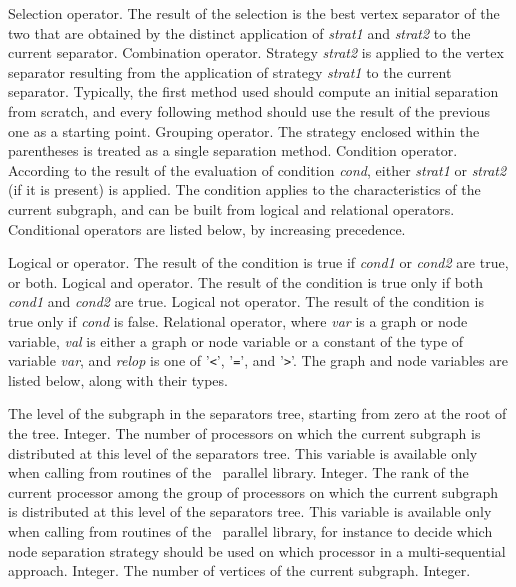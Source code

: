 \begin{itemize}
Selection operator. The result of the selection is the best vertex separator of
the two that are obtained by the distinct application of {\it strat1\/} and
{\it strat2\/} to the current separator.
Combination operator. Strategy {\it strat2\/} is applied to the vertex
separator resulting from the application of strategy {\it strat1\/} to the
current separator. Typically, the first method used should compute an initial
separation from scratch, and every following method should use the
result of the previous one as a starting point.
\iteme[{\tt (}{\it strat\/}{\tt )}]
Grouping operator.
The strategy enclosed within the parentheses is treated as a single
separation method.
Condition operator. According to the result of the evaluation of condition
{\it cond}, either {\it strat1\/} or {\it strat2\/} (if it is present) is
applied. The condition applies to the characteristics of the current subgraph,
and can be built from logical and relational operators. Conditional
operators are listed below, by increasing precedence.
\begin{itemize}
Logical or operator. The result of the condition is true if {\it cond1\/}
or {\it cond2\/} are true, or both.
Logical and operator. The result of the condition is true only if both
{\it cond1\/} and {\it cond2\/} are true.
\iteme[{\tt !}{\it cond}]
Logical not operator. The result of the condition is true only if
{\it cond\/} is false.
Relational operator, where {\it var\/} is a graph or node variable,
{\it val\/} is either a graph or node variable or a constant of the type of
variable {\it var\/}, and {\it relop\/} is one of
'{\tt\verb+<+}', '{\tt\verb+=+}', and '{\tt\verb+>+}'.
The graph and node variables are listed below, along with their types.
\begin{itemize}
\iteme[{\tt levl}]
The level of the subgraph in the separators tree, starting from zero at the root
of the tree.
Integer.
\iteme[{\tt proc}]
The number of processors on which the current subgraph is distributed
at this level of the separators tree. This variable is available only
when calling from routines of the \ptscotch\ parallel library.
Integer.
\iteme[{\tt rank}]
The rank of the current processor among the group of processors on
which the current subgraph is distributed at this level of the
separators tree. This variable is available only
when calling from routines of the \ptscotch\ parallel library, for
instance to decide which node separation strategy should be used on
which processor in a multi-sequential approach.
Integer.
\iteme[{\tt vert}]
The number of vertices of the current subgraph.
Integer.
\end{itemize}
\end{itemize}
\end{itemize}

